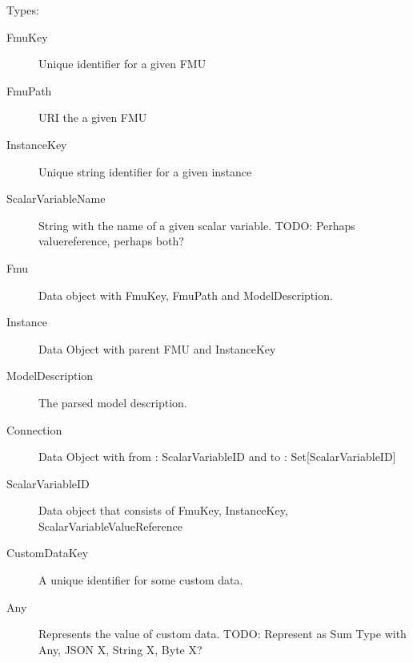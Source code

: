 Types:
\begin{description}
  \item[FmuKey] Unique identifier for a given FMU
  \item[FmuPath] URI the a given FMU
  \item[InstanceKey] Unique string identifier for a given instance
  \item[ScalarVariableName] String with the name of a given scalar variable.
    TODO: Perhaps valuereference, perhaps both?
  \item[Fmu] Data object with FmuKey, FmuPath and ModelDescription.
  \item[Instance] Data Object with parent FMU and InstanceKey
  \item[ModelDescription] The parsed model description.
  \item[Connection] Data Object with from : ScalarVariableID and to : Set[ScalarVariableID]
  \item[ScalarVariableID] Data object that consists of FmuKey,
    InstanceKey, ScalarVariableValueReference
  \item[CustomDataKey] A unique identifier for some custom data.
  \item[Any] Represents the value of custom data.
    TODO: Represent as Sum Type with Any, JSON X, String X, Byte X?
\end{description}

